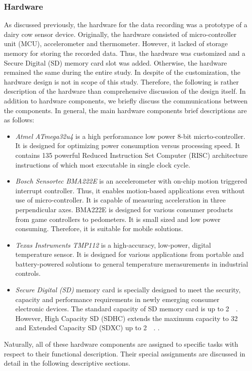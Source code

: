 \documentclass[english,12pt,a4paper,pdftex,elec,utf8]{aaltothesis}
\begin{document}
\subsubsection{Hardware} \label{hardwaresection}

As discussed previously, the hardware for the data recording was a prototype of a dairy cow sensor device. Originally, the hardware consisted of micro-controller unit (MCU), accelerometer and thermometer. However, it lacked of storage memory for storing the recorded data. Thus, the hardware was customized and a Secure Digital (SD) memory card slot was added. Otherwise, the hardware remained the same during the entire study. In despite of the customization, the hardware design is not in scope of this study. Therefore, the following is rather description of the hardware than comprehensive discussion of the design itself. In addition to hardware components, we briefly discuss the communications between the components. In general, the main hardware components brief descriptions are as follows:

\begin{itemize}
\item \textit{Atmel ATmega32u4} is a high perforamance low power 8-bit micrto-controller. It is designed for optimizing power consumption versus processing speed. It contains 135 powerful Reduced Instruction Set Computer (RISC) architecture instructions of which most executable in single clock cycle.  \cite{atmega32u4datasheet} 


\item \textit{Bosch Sensortec BMA222E} is an accelerometer with on-chip motion triggered interrupt controller. Thus, it enables motion-based applications even without use of micro-controller. It is capable of measuring acceleration in three perpendicular axes. BMA222E is designed for various consumer products from game controllers to pedometers. It is small sized and low power consuming. Therefore, it is suitable for mobile solutions.  \cite{bma222datasheet} 

\item \textit{Texas Instruments TMP112} is a high-accuracy, low-power, digital temperature sensor. It is designed for various applications from portable and battery-powered solutions to general temperature merasurements in industrial controls. \cite{tmp112datasheet} 

\item \textit{Secure Digital (SD)} memory card is specially designed to meet the security, capacity and performance requirements in newly emerging consumer electronic devices. The standard capacity of SD memory card is up to \SI{2}{\giga\byte}. However, High Capacity SD (SDHC) extends the maximum capacity to \SI{32}{\giga\byte} and Extended Capacity SD (SDXC) up to \SI{2}{\tera\byte}. \cite{sdspecification}.

\end{itemize} Naturally, all of these hardware components are assigned to specific tasks with respect to their functional description. Their special assignments are discussed in detail in the following descriptive sections.
\end{document}
